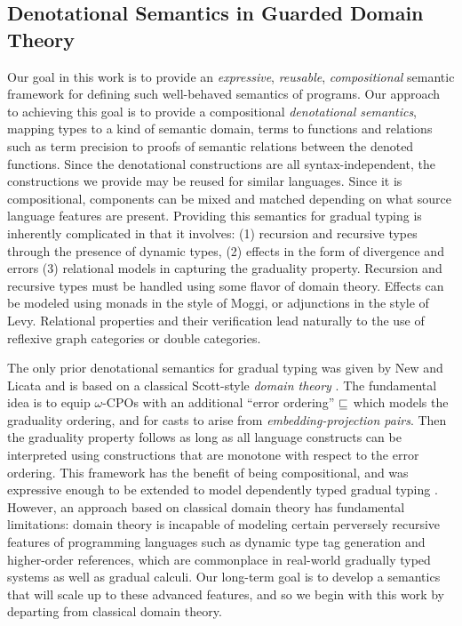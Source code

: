 \subsection{Denotational Semantics in Guarded Domain Theory}

Our goal in this work is to provide an \emph{expressive},
\emph{reusable}, \emph{compositional} semantic framework for defining
such well-behaved semantics of programs.
%
Our approach to achieving this goal is to provide a compositional
\emph{denotational semantics}, mapping types to a kind of semantic
domain, terms to functions and relations such as term precision to
proofs of semantic relations between the denoted functions.
%
Since the denotational constructions are all syntax-independent, the
constructions we provide may be reused for similar languages. Since it
is compositional, components can be mixed and matched depending on
what source language features are present.
%
Providing this semantics for gradual typing is inherently complicated
in that it involves: (1) recursion and recursive types through the
presence of dynamic types, (2) effects in the form of divergence and
errors (3) relational models in capturing the graduality
property. Recursion and recursive types must be handled using some
flavor of domain theory. Effects can be modeled using monads in the
style of Moggi, or adjunctions in the style of Levy. Relational
properties and their verification lead naturally to the use of
reflexive graph categories or double categories.

The only prior denotational semantics for gradual typing was given by
New and Licata and is based on a classical Scott-style \emph{domain
theory} \cite{new-licata18}. The fundamental idea is to equip
$\omega$-CPOs with an additional ``error ordering'' $\sqsubseteq$ which
models the graduality ordering, and for casts to arise from
\emph{embedding-projection pairs}. Then the graduality property
follows as long as all language constructs can be interpreted using
constructions that are monotone with respect to the error ordering.
%
This framework has the benefit of being compositional, and was
expressive enough to be extended to model dependently typed gradual
typing \cite{10.1145/3495528}.
%
However, an approach based on classical domain theory has fundamental
limitations: domain theory is incapable of modeling certain perversely
recursive features of programming languages such as dynamic type tag
generation and higher-order references, which are commonplace in
real-world gradually typed systems as well as gradual calculi. Our
long-term goal is to develop a semantics that will scale up to these
advanced features, and so we begin with this work by departing from
classical domain theory.

